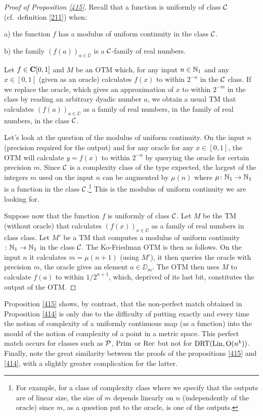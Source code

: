 \begin{proof}[Proof of Proposition \ref{415}] 
Recall that a function is uniformly of class ${{\cal C}}$ (cf.\ definition 
\ref{211}) when:


\noindent 
a) the function $f$ has a modulus of uniform continuity in the class ${{\cal C}}$.

\noindent 
b) the family $(f(a))_{a \in \DD}$ is a ${{\cal C}}$-family of 
real numbers.

\noindent 
Let $f \in {{\bf C}[0,1]}$ and $M$ be an OTM which, for any input $n \in \mathbb {N}_1$ and any $x \in [0,1]$ (given as an oracle) calculates $f(x)$ to within $2^{-n}$ in the ${{\cal C}}$ class. If we replace the oracle, which 
gives an approximation of $x$ to within $2^{-m}$ in the class by reading an arbitrary dyadic number $a$, we obtain a usual TM that calculates $(f(a))_{a \in \DD}$ as a family of real numbers, in the 
family of real numbers, in the class ${{\cal C}}$. 

\noindent 
Let's look at the question of the modulus of uniform continuity. On the input $n$ (precision required for the output) and for any oracle for any $x \in [0,1]$, the OTM will calculate $y=f(x)$ to within $2^{-n}$ by querying the oracle for certain precision $m$. Since ${{\cal C}}$ is a complexity class of the type expected, the largest of the integers $m$ used on the input $n$ can be  augmented by $\mu(n)$ where $\mu\colon \mathbb {N}_1 \to \mathbb {N}_1$ is a function in the class ${{\cal C}}$.\footnote{For example, for a class of complexity class where we specify that the outputs are of linear size, the size of $m$ depends linearly on $n$ (independently of the oracle) since $m$, as a question put to the oracle, is one of the outputs.} This is the modulus of uniform continuity we are looking for.

\noindent 
Suppose now that the function $f$ is uniformly of class ${{\cal C}}$.
 Let $M$ be the TM (without oracle) that calculates $(f(x))_{x \in \DD}$ as a family of real numbers in class class. 
Let $M'$ be a TM that computes a modulus of uniform continuity $\colon \mathbb {N}_1 \to \mathbb {N}_1$ in the class ${{\cal C}}$. The Ko-Friedman OTM is then as follows. 
On the input $n$ it calculates $m = \mu(n+1)$ (using $M'$), it then queries the oracle with precision $m$, the oracle gives an element $a \in \DD_m$. The OTM then uses $M$ to calculate $f(a)$ to within $1/2^{n+1}$, which, deprived of its last bit, constitutes the output of the OTM. 
\end{proof}
 

Proposition \ref{415} shows, by contrast, that the non-perfect match obtained in Proposition \ref{414} is only due to the difficulty of putting exactly and every time the notion of complexity of a uniformly continuous map (as a function) into the mould of the notion of complexity of a point in a metric space. This perfect match occurs for classes such as ${\cal P}$, ${\rm Prim} $ or ${\rm Rec} $ but not for ${\rm DRT}({\rm Lin}, {\rm O}(n^k))$. 
\\ 
Finally, note the great similarity between the proofs of the propositions \ref{415} and \ref{414}, with a slightly greater complication for the latter. 


